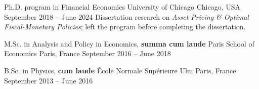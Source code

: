 

\begin{cventries}

	\cventry
	{Ph.D. program in Financial Economics} %
	{University of Chicago} %
	{Chicago, USA} %
	{September 2018 – June 2024} %
	{Dissertation research on \textit{Asset Pricing \& Optimal Fiscal-Monetary Policies}; left the program before completing the dissertation.}

	\cventry
	{M.Sc. in Analysis and Policy in Economics, \textbf{summa cum laude}} %
	{Paris School of Economics} %
	{Paris, France} %
	{September 2016 – June 2018} %
	{}

	\cventry
	{B.Sc. in Physics, \textbf{cum laude}} %
	{École Normale Supérieure Ulm} %
	{Paris, France} %
	{September 2013 – June 2016} %
	{}

\end{cventries}
